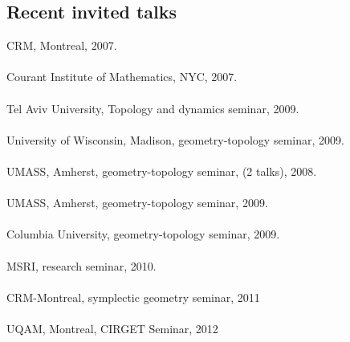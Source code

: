 \documentclass[overlapped,line,letterpaper]{res}
\begin{document}
\begin{resume}
\section {\sc Recent invited talks}
 CRM, Montreal,  2007. \\\\
   Courant Institute of 
Mathematics, NYC, 2007.  \\\\
Tel Aviv University, Topology and dynamics seminar, 2009. \\\\
University of Wisconsin, Madison, geometry-topology seminar, 2009. \\\\
 UMASS, Amherst, geometry-topology seminar,  (2 talks), 2008. \\\\
 UMASS, Amherst, geometry-topology seminar, 2009. \\\\
Columbia University, geometry-topology seminar, 2009. \\\\
MSRI, research seminar, 2010. \\\\
CRM-Montreal, symplectic geometry seminar, 2011\\\\
UQAM, Montreal, CIRGET Seminar, 2012 \\\\

\end{resume}
\end{document}
